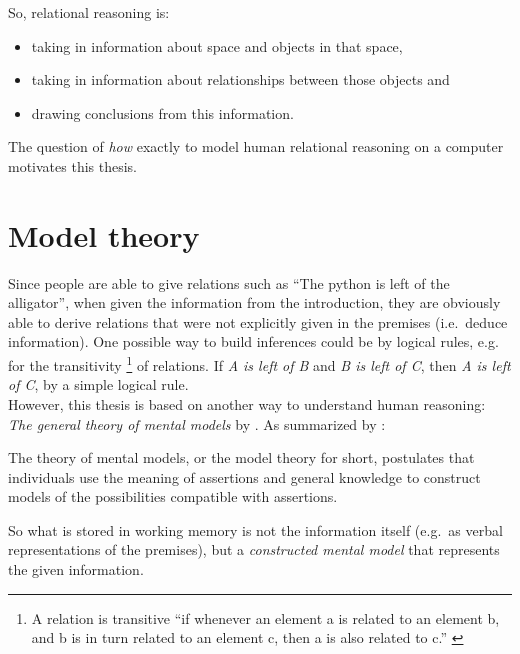 \documentclass[hidelinks]{scrartcl}
\begin{document}
\noindent So, relational reasoning is:
\begin{itemize}
\item taking in information about space and objects in that space, 
\item taking in information about relationships between those objects and
\item drawing conclusions from this information.
\end{itemize}

The question of \textit{how} exactly to model human relational reasoning on a computer motivates this thesis.

\section{Model theory}\label{sec:model_theory}
Since people are able to give relations such as ``The python is left of the alligator'', when given the information from the introduction, they are obviously able to derive relations that were not explicitly given in the premises (i.e.\ deduce information). One possible way to build inferences could be by logical rules, e.g. for the transitivity \footnote{A relation is transitive ``if whenever an element a is related to an element b, and b is in turn related to an element c, then a is also related to c.'' \citep{Wikipedia.Transitive}} of relations. If \textit{A is left of B} and \textit{B is left of C}, then \textit{A is left of C}, by a simple logical rule. \\
However, this thesis is based on another way to understand human reasoning: \textit{The general theory of mental models} by \cite{Johnson-Laird.1986}. As summarized by \cite*{Jahn.2007}:

\begin{displayquote}
The theory of mental models, or the model theory for short, postulates that individuals use the meaning of assertions and general knowledge to construct models of the possibilities compatible with assertions.
\end{displayquote}

So what is stored in \gls{working memory} is not the information itself (e.g.\ as verbal representations of the premises), but a \textit{constructed mental model} that represents the given information.
\end{document}
